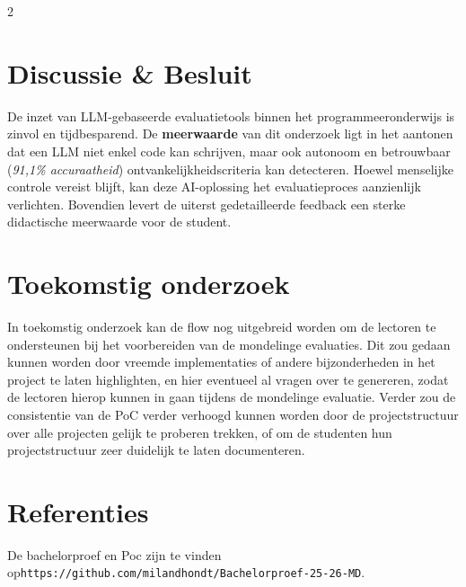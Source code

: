 \documentclass[a0,portrait]{hogent-poster}
\begin{document}
\begin{multicols}{2}
\section{Discussie \& Besluit}
De inzet van LLM-gebaseerde evaluatietools binnen het programmeeronderwijs is zinvol en tijdbesparend. De \textbf{meerwaarde} van dit onderzoek ligt in het aantonen dat een LLM niet enkel code kan schrijven, maar ook autonoom en betrouwbaar (\textit{91,1\% accuraatheid}) ontvankelijkheidscriteria kan detecteren. Hoewel menselijke controle vereist blijft, kan deze AI-oplossing het evaluatieproces aanzienlijk verlichten. Bovendien levert de uiterst gedetailleerde feedback een sterke didactische meerwaarde voor de student.

\section{Toekomstig onderzoek}
In toekomstig onderzoek kan de flow nog uitgebreid worden om de lectoren te ondersteunen bij het voorbereiden van de mondelinge evaluaties. Dit zou gedaan kunnen worden door vreemde implementaties of andere bijzonderheden in het project te laten highlighten, en hier eventueel al vragen over te genereren, zodat de lectoren hierop kunnen in gaan tijdens de mondelinge evaluatie. Verder zou de consistentie van de PoC verder verhoogd kunnen worden door de projectstructuur over alle projecten gelijk te proberen trekken, of om de studenten hun projectstructuur zeer duidelijk te laten documenteren.

\section{Referenties}
De bachelorproef en Poc zijn te vinden op\newline \texttt{https://github.com/milandhondt/Bachelorproef-25-26-MD}.

\end{multicols}
\end{document}
